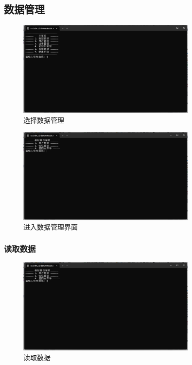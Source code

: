 \documentclass[12pt,twoside]{ctexart}
\begin{document}
\subsection{数据管理}

\begin{figure}[H]
    \centering
    \includegraphics[width=0.8\textwidth]{SelectData.png}
    \caption{选择数据管理}
\end{figure}

\begin{figure}[H]
    \centering
    \includegraphics[width=0.8\textwidth]{DataM.png}
    \caption{进入数据管理界面}
\end{figure}

\subsubsection{读取数据}
\begin{figure}[H]
    \centering
    \includegraphics[width=0.8\textwidth]{ReadData.png}
    \caption{读取数据}
\end{figure}
\end{document}
